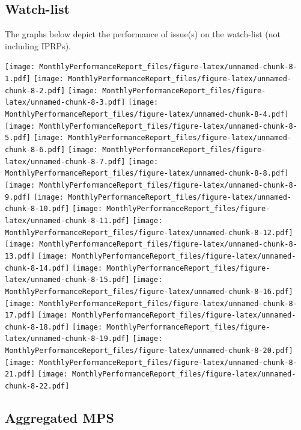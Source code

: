 \documentclass[12pt,table]{article}
\begin{document}
\hypertarget{watch-list-1}{%
\subsection{Watch-list}\label{watch-list-1}}

The graphs below depict the performance of issue(s) on the watch-list
(not including IPRPs).

\texttt{[image: MonthlyPerformanceReport\_files/figure-latex/unnamed-chunk-8-1.pdf]}
\texttt{[image: MonthlyPerformanceReport\_files/figure-latex/unnamed-chunk-8-2.pdf]}
\texttt{[image: MonthlyPerformanceReport\_files/figure-latex/unnamed-chunk-8-3.pdf]}
\texttt{[image: MonthlyPerformanceReport\_files/figure-latex/unnamed-chunk-8-4.pdf]}
\texttt{[image: MonthlyPerformanceReport\_files/figure-latex/unnamed-chunk-8-5.pdf]}
\texttt{[image: MonthlyPerformanceReport\_files/figure-latex/unnamed-chunk-8-6.pdf]}
\texttt{[image: MonthlyPerformanceReport\_files/figure-latex/unnamed-chunk-8-7.pdf]}
\texttt{[image: MonthlyPerformanceReport\_files/figure-latex/unnamed-chunk-8-8.pdf]}
\texttt{[image: MonthlyPerformanceReport\_files/figure-latex/unnamed-chunk-8-9.pdf]}
\texttt{[image: MonthlyPerformanceReport\_files/figure-latex/unnamed-chunk-8-10.pdf]}
\texttt{[image: MonthlyPerformanceReport\_files/figure-latex/unnamed-chunk-8-11.pdf]}
\texttt{[image: MonthlyPerformanceReport\_files/figure-latex/unnamed-chunk-8-12.pdf]}
\texttt{[image: MonthlyPerformanceReport\_files/figure-latex/unnamed-chunk-8-13.pdf]}
\texttt{[image: MonthlyPerformanceReport\_files/figure-latex/unnamed-chunk-8-14.pdf]}
\texttt{[image: MonthlyPerformanceReport\_files/figure-latex/unnamed-chunk-8-15.pdf]}
\texttt{[image: MonthlyPerformanceReport\_files/figure-latex/unnamed-chunk-8-16.pdf]}
\texttt{[image: MonthlyPerformanceReport\_files/figure-latex/unnamed-chunk-8-17.pdf]}
\texttt{[image: MonthlyPerformanceReport\_files/figure-latex/unnamed-chunk-8-18.pdf]}
\texttt{[image: MonthlyPerformanceReport\_files/figure-latex/unnamed-chunk-8-19.pdf]}
\texttt{[image: MonthlyPerformanceReport\_files/figure-latex/unnamed-chunk-8-20.pdf]}
\texttt{[image: MonthlyPerformanceReport\_files/figure-latex/unnamed-chunk-8-21.pdf]}
\texttt{[image: MonthlyPerformanceReport\_files/figure-latex/unnamed-chunk-8-22.pdf]}

\hypertarget{aggregated-mps}{%
\subsection{Aggregated MPS}\label{aggregated-mps}}
\end{document}
